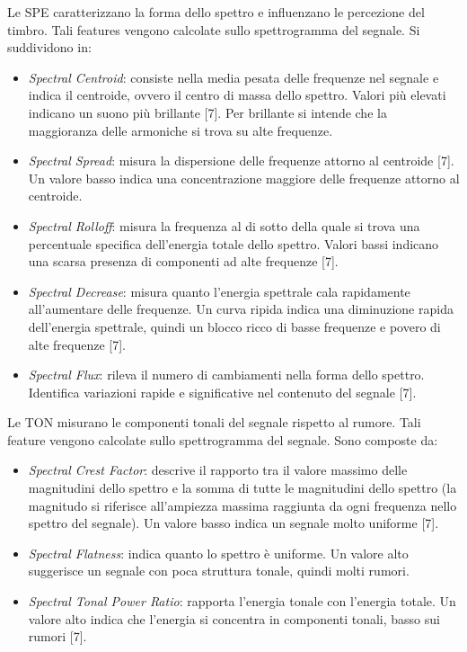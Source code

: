 Le SPE caratterizzano la forma dello spettro e influenzano le percezione del timbro. Tali
features vengono calcolate sullo spettrogramma del segnale. Si suddividono in:
\begin{itemize}
	\item{\textit{Spectral Centroid}: consiste nella media pesata delle frequenze nel segnale e indica il
		centroide, ovvero il centro di massa dello spettro. Valori più elevati indicano un suono
		più brillante [7]. Per brillante si intende che la maggioranza delle armoniche si trova
		su alte frequenze.}
	\item{\textit{Spectral Spread}: misura la dispersione delle frequenze attorno al centroide [7]. Un
		valore  basso indica una concentrazione maggiore delle frequenze attorno al centroide.}
	\item{\textit{Spectral Rolloff}: misura la frequenza al di sotto della quale si trova una percentuale
		specifica dell'energia totale dello spettro. Valori bassi indicano una scarsa presenza di
		componenti ad alte frequenze [7].}
	\item{\textit{Spectral Decrease}: misura quanto l’energia spettrale cala rapidamente all’aumentare
		delle frequenze. Un curva ripida indica una diminuzione rapida dell’energia spettrale,
		quindi un blocco ricco di basse frequenze e povero di alte frequenze [7].}
	\item{\textit{Spectral Flux}: rileva il numero di cambiamenti nella forma dello spettro. Identifica
		variazioni rapide e significative nel contenuto del segnale [7].}
\end{itemize}
Le TON misurano le componenti tonali del segnale rispetto al rumore. Tali feature vengono
calcolate sullo spettrogramma del segnale. Sono composte da:
\begin{itemize}
	\item{\textit{Spectral Crest Factor}: descrive il rapporto tra il valore massimo delle magnitudini
		dello spettro e la somma di tutte le magnitudini dello spettro (la magnitudo si riferisce
		all’ampiezza massima raggiunta da ogni frequenza nello spettro del segnale). Un
		valore basso indica un segnale molto uniforme [7].}
	\item{\textit{Spectral Flatness}: indica quanto lo spettro è uniforme. Un valore alto suggerisce un
			segnale con poca struttura tonale, quindi molti rumori.}
	\item{\textit{Spectral Tonal Power Ratio}: rapporta l’energia tonale con l’energia totale. Un valore
			alto indica che l’energia si concentra in componenti tonali, basso sui rumori [7].}
\end{itemize}
